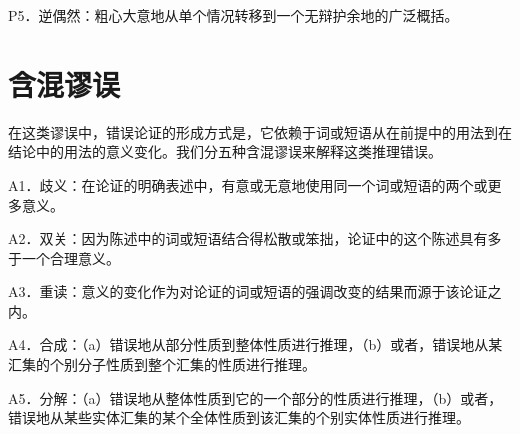 P5．逆偶然：粗心大意地从单个情况转移到一个无辩护余地的广泛概括。

\section*{含混谬误}
在这类谬误中，错误论证的形成方式是，它依赖于词或短语从在前提中的用法到在结论中的用法的意义变化。我们分五种含混谬误来解释这类推理错误。

A1．歧义：在论证的明确表述中，有意或无意地使用同一个词或短语的两个或更多意义。

A2．双关：因为陈述中的词或短语结合得松散或笨拙，论证中的这个陈述具有多于一个合理意义。

A3．重读：意义的变化作为对论证的词或短语的强调改变的结果而源于该论证之内。

A4．合成：（a）错误地从部分性质到整体性质进行推理，（b）或者，错误地从某汇集的个别分子性质到整个汇集的性质进行推理。

A5．分解：（a）错误地从整体性质到它的一个部分的性质进行推理，（b）或者，错误地从某些实体汇集的某个全体性质到该汇集的个别实体性质进行推理。 